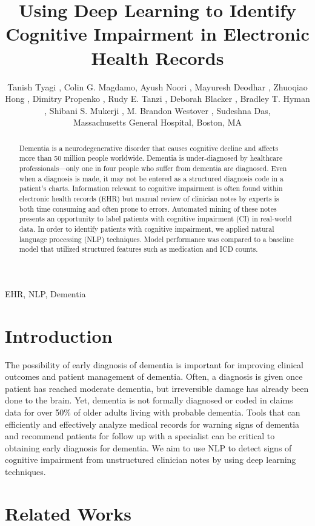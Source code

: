 \documentclass[pmlr,twocolumn,10pt]{jmlr} %
\title[NLP Techniques to Detect Cognitive Impairment]{Using Deep Learning to Identify Cognitive Impairment in Electronic Health Records}
\author{Tanish Tyagi \nametag{\thanks{Authors contributed equally}\SUP{1}},
Colin G. Magdamo\nametag{\footnotemark[1]\SUP{1}}, 
Ayush Noori \SUP{1},
Mayuresh Deodhar \SUP{1},
Zhuoqiao Hong \SUP{1},
Dimitry Propenko \SUP{1},
Rudy E. Tanzi \SUP{1},
Deborah Blacker \SUP{1},
Bradley T. Hyman \SUP{1},
Shibani S. Mukerji \SUP{1},
M. Brandon Westover \SUP{1},
Sudeshna Das\SUP{1},
\centering \Email{
\\[\bigskipamount] 
\SUP{1}\{ttanish, 
cmagdamo,
anoori1,
...
sdas5\}
@mgh.harvard.edu}
% 
\begin{center}\addr Massachusetts General Hospital, Boston, MA\end{center}
}
\begin{document}
\maketitle

\begin{abstract}
\hspace{10mm} Dementia is a neurodegenerative disorder that causes cognitive decline and affects more than 50 million people worldwide. Dementia is under-diagnosed by healthcare professionals—only one in four people who suffer from dementia are diagnosed. Even when a diagnosis is made, it may not be entered as a structured diagnosis code in a patient’s charts.  Information relevant to cognitive impairment is often found within electronic health records (EHR) but manual review of clinician notes by experts is both time consuming and often prone to errors. Automated mining of these notes presents an opportunity to label patients with cognitive impairment (CI) in real-world data. In order to identify patients with cognitive impairment, we applied natural language processing (NLP) techniques. Model performance was compared to a baseline model that utilized structured features such as medication and ICD counts. %
\end{abstract}

\begin{keywords}
EHR, NLP, Dementia
\end{keywords}

\section{Introduction}
\label{sec:intro} The possibility of early diagnosis of dementia is important for improving clinical outcomes and patient management of dementia. Often, a diagnosis is given once patient has reached moderate dementia, but irreversible damage has already been done to the brain. 
Yet, dementia is not formally diagnosed or coded in claims data for over 50\% of older adults living with probable dementia. Tools that can efficiently and effectively analyze medical records for warning signs of dementia and recommend patients for follow up with a specialist can be critical to obtaining early diagnosis for dementia. We aim to use NLP to detect signs of cognitive impairment from unstructured clinician notes by using deep learning techniques. 

\section{Related Works}
\label{sec:RelatedWorks}
\end{document}
